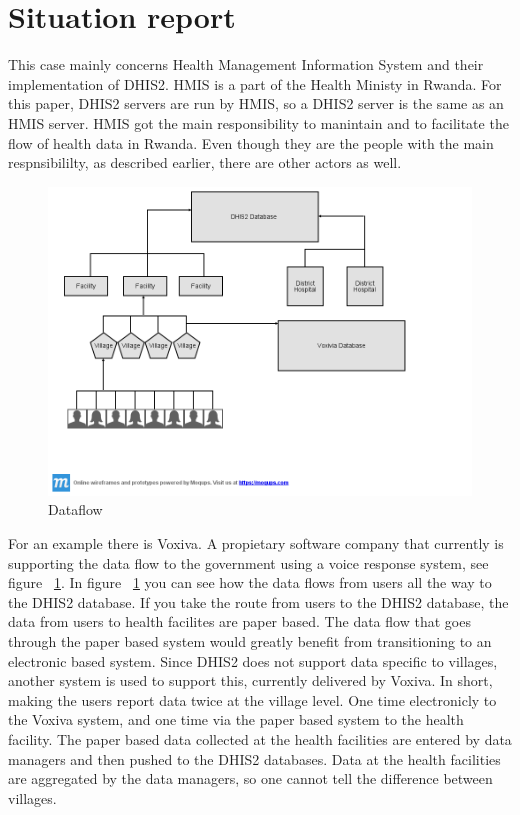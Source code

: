 \section{Situation report}
This case mainly concerns Health Management Information System and their implementation of DHIS2. HMIS is a part of the Health Ministy in Rwanda. For this paper, DHIS2 servers are run by HMIS, so a DHIS2 server is the same as an HMIS server. 
HMIS got the main responsibility to manintain and to facilitate the flow of health data in Rwanda. Even though they are the people with the main respnsibililty, as described earlier, there are other actors as well.
\begin{figure}
\centering
\includegraphics[width=12cm]{empirical/images/dataflow}
\caption{Dataflow}
\label{fig:dataflow}
\end{figure}
For an example there is Voxiva. A propietary software company that currently is supporting the data flow to the government using a voice response system, see figure ~\ref{fig:dataflow}. 
In figure ~\ref{fig:dataflow} you can see how the data flows from users all the way to the DHIS2 database. If you take the route from users to the DHIS2 database, the data from users to health facilites are paper based.
The data flow that goes through the paper based system would greatly benefit from transitioning to an electronic based system.
Since DHIS2 does not support data specific to villages, another system is used to support this, currently delivered by Voxiva.
In short, making the users report data twice at the village level. One time electronicly to the Voxiva system, and one time via the paper based system to the health facility.
The paper based data collected at the health facilities are entered by data managers and then pushed to the DHIS2 databases. Data at the health facilities are aggregated by the data managers, so one cannot tell the difference between villages. 
